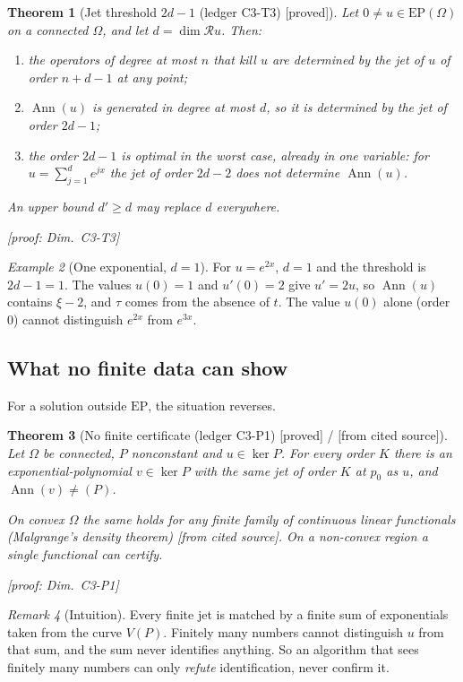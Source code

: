 \documentclass[11pt]{article}
\theoremstyle{plain}
\newtheorem{theorem}{Theorem}[section]
\theoremstyle{definition}
\theoremstyle{remark}
\newtheorem{remark}[theorem]{Remark}
\newtheorem{example}[theorem]{Example}
\newcommand{\ring}{\mathcal{R}}            %
\DeclareMathOperator{\Ann}{Ann}             %
\newcommand{\Var}{V}                        %
\newcommand{\EP}{\mathrm{EP}}               %
\DeclareMathOperator{\dimc}{dim}
\newcommand{\badge}[2]{\textcolor{#1}{\textsf{\footnotesize[#2]}}}
\newcommand{\proved}[1][]{\badge{cC}{proved#1}}
\newcommand{\led}[1]{\textcolor{cG}{\textsf{\footnotesize(ledger #1)}}}
\newenvironment{intuition}{\begin{remark}[Intuition]}{\end{remark}}
\newcommand{\dimref}[1]{\textsf{\footnotesize[proof: Dim.~#1]}}
\newcommand{\cf}{\badge{cD}{from cited source}}
\begin{document}
\begin{theorem}[{Jet threshold $2d-1$ \led{C3-T3} \proved}]\label{thm:jet-threshold}
Let $0\ne u\in\EP(\Omega)$ on a connected $\Omega$, and let $d=\dimc\ring u$. Then:
\begin{enumerate}[label=(\roman*)]
\item the operators of degree at most $n$ that kill $u$ are determined by the jet of $u$ of order $n+d-1$ at any point;
\item $\Ann(u)$ is generated in degree at most $d$, so it is determined by the jet of order $2d-1$;
\item the order $2d-1$ is optimal in the worst case, already in one variable: for $u=\sum_{j=1}^de^{jx}$ the jet of order $2d-2$ does not determine $\Ann(u)$.
\end{enumerate}
An upper bound $d'\ge d$ may replace $d$ everywhere.

\dimref{C3-T3}
\end{theorem}

\begin{example}[{One exponential, $d=1$}]
For $u=e^{2x}$, $d=1$ and the threshold is $2d-1=1$. The values $u(0)=1$ and $u'(0)=2$ give $u'=2u$, so $\Ann(u)$ contains $\xi-2$, and $\tau$ comes from the absence of $t$. The value $u(0)$ alone (order $0$) cannot distinguish $e^{2x}$ from $e^{3x}$.
\end{example}

\subsection{What no finite data can show}

For a solution outside $\EP$, the situation reverses.

\begin{theorem}[{No finite certificate \led{C3-P1} \proved{} / \cf}]\label{f:thm:nocert}
Let $\Omega$ be connected, $P$ nonconstant and $u\in\ker P$. For every order $K$ there is an exponential-polynomial $v\in\ker P$ with the same jet of order $K$ at $p_0$ as $u$, and $\Ann(v)\ne(P)$.

On convex $\Omega$ the same holds for any finite family of continuous linear functionals (Malgrange's density theorem) \cf. On a non-convex region a single functional can certify.

\dimref{C3-P1}
\end{theorem}

\begin{intuition}
Every finite jet is matched by a finite sum of exponentials taken from the curve $\Var(P)$. Finitely many numbers cannot distinguish $u$ from that sum, and the sum never identifies anything. So an algorithm that sees finitely many numbers can only \emph{refute} identification, never confirm it.
\end{intuition}
\end{document}
